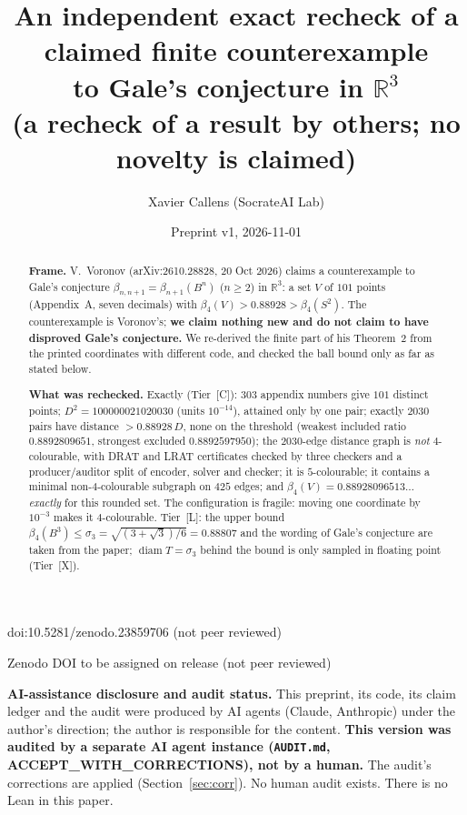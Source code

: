 \documentclass[10pt]{article}
\title{An independent exact recheck of a claimed finite counterexample\\
to Gale's conjecture in $\mathbb{R}^3$\\
{\large (a recheck of a result by others; no novelty is claimed)}}
\author{Xavier Callens (SocrateAI Lab)}
\date{Preprint v1, 2026-11-01}
\newcommand{\tier}[1]{\textsf{[#1]}}
\newcommand{\tL}{\tier{L}}
\newcommand{\tC}{\tier{C}}
\newcommand{\tX}{\tier{X}}
\newcommand{\bb}{\beta}
\begin{document}
\maketitle
\begin{center}\small doi:10.5281/zenodo.23859706 \quad (not peer reviewed)\end{center}

\begin{center}\small Zenodo DOI to be assigned on release \quad (not peer reviewed)\end{center}

\noindent\textbf{AI-assistance disclosure and audit status.} This preprint, its code, its claim ledger and the audit were produced by AI agents (Claude, Anthropic) under the author's direction; the author is responsible for the content.
\textbf{This version was audited by a separate AI agent instance (\texttt{AUDIT.md}, ACCEPT\_WITH\_CORRECTIONS), not by a human.} The audit's corrections are applied (Section~\ref{sec:corr}). No human audit exists. There is no Lean in this paper.

\begin{abstract}
\noindent\textbf{Frame.} V.~Voronov (arXiv:2610.28828, 20 Oct 2026) claims a counterexample to Gale's conjecture $\bb_{n,n+1}=\bb_{n+1}(B^n)$ ($n\ge2$) in $\mathbb{R}^3$: a set $V$ of $101$ points (Appendix~A, seven decimals) with $\bb_4(V)>0.88928>\bb_4(S^2)$. The counterexample is Voronov's; \textbf{we claim nothing new and do not claim to have disproved Gale's conjecture.} We re-derived the finite part of his Theorem~2 from the printed coordinates with different code, and checked the ball bound only as far as stated below.

\noindent\textbf{What was rechecked.} Exactly (Tier~\tC{}): $303$ appendix numbers give $101$ distinct points; $D^2=100000021020030$ (units $10^{-14}$), attained only by one pair; exactly $2030$ pairs have distance $>0.88928\,D$, none on the threshold (weakest included ratio $0.8892809651$, strongest excluded $0.8892597950$); the $2030$-edge distance graph is \emph{not} $4$-colourable, with DRAT and LRAT certificates checked by three checkers and a producer/auditor split of encoder, solver and checker; it is $5$-colourable; it contains a minimal non-$4$-colourable subgraph on $425$ edges; and $\bb_4(V)=0.88928096513\ldots$ \emph{exactly} for this rounded set. The configuration is fragile: moving one coordinate by $10^{-3}$ makes it $4$-colourable. Tier~\tL{}: the upper bound $\bb_4(B^3)\le\sigma_3=\sqrt{(3+\sqrt3)/6}=0.88807$ and the wording of Gale's conjecture are taken from the paper; $\operatorname{diam}T=\sigma_3$ behind the bound is only sampled in floating point (Tier~\tX{}).
\end{abstract}
\end{document}
